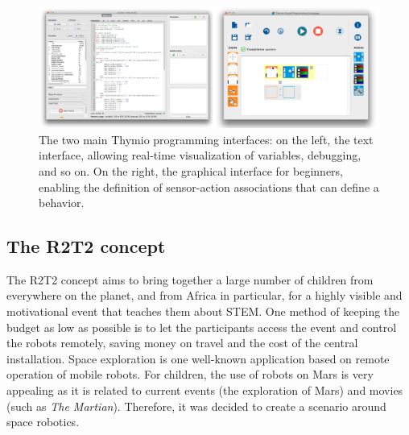 \documentclass{intech-journal}
\begin{document}
\begin{figure}[ht]
 \centering
    \includegraphics[width=0.9\columnwidth]{figures/studio-VPL.png}
  \caption{The two main Thymio programming interfaces: on the left, the text interface, allowing real-time visualization of variables, debugging, and so on. On the right, the graphical interface for beginners, enabling the definition of sensor-action associations that can define a behavior.}
  \label{fig:programming} 
\end{figure}

\subsection{The R2T2 concept}

The R2T2 concept aims to bring together a large number of children from everywhere on the planet, and from Africa in particular, for a highly visible and motivational event that teaches them about STEM.
One method of keeping the budget as low as possible is to let the participants access the event and control the robots remotely, saving money on travel and the cost of the central installation.
Space exploration is one well-known application based on remote operation of mobile robots.
For children, the use of robots on Mars is very appealing as it is related to current events (the exploration of Mars) and movies (such as \textit{The Martian}).
Therefore, it was decided to create a scenario around space robotics.
\end{document}
